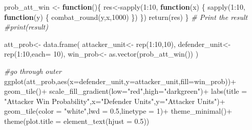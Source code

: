 \documentclass[
]{article}
\newenvironment{Shaded}{\begin{snugshade}}{\end{snugshade}}
\newcommand{\AttributeTok}[1]{\textcolor[rgb]{0.77,0.63,0.00}{#1}}
\newcommand{\CommentTok}[1]{\textcolor[rgb]{0.56,0.35,0.01}{\textit{#1}}}
\newcommand{\ControlFlowTok}[1]{\textcolor[rgb]{0.13,0.29,0.53}{\textbf{#1}}}
\newcommand{\DecValTok}[1]{\textcolor[rgb]{0.00,0.00,0.81}{#1}}
\newcommand{\FloatTok}[1]{\textcolor[rgb]{0.00,0.00,0.81}{#1}}
\newcommand{\FunctionTok}[1]{\textcolor[rgb]{0.00,0.00,0.00}{#1}}
\newcommand{\NormalTok}[1]{#1}
\newcommand{\OtherTok}[1]{\textcolor[rgb]{0.56,0.35,0.01}{#1}}
\newcommand{\SpecialCharTok}[1]{\textcolor[rgb]{0.00,0.00,0.00}{#1}}
\newcommand{\StringTok}[1]{\textcolor[rgb]{0.31,0.60,0.02}{#1}}
\begin{document}
\begin{Shaded}
\begin{Highlighting}[]
\NormalTok{prob\_att\_win }\OtherTok{\textless{}{-}} \ControlFlowTok{function}\NormalTok{()\{}
\NormalTok{  res}\OtherTok{\textless{}{-}}\FunctionTok{sapply}\NormalTok{(}\DecValTok{1}\SpecialCharTok{:}\DecValTok{10}\NormalTok{, }\ControlFlowTok{function}\NormalTok{(x) \{}
  \FunctionTok{sapply}\NormalTok{(}\DecValTok{1}\SpecialCharTok{:}\DecValTok{10}\NormalTok{, }\ControlFlowTok{function}\NormalTok{(y) \{}
    \FunctionTok{combat\_round}\NormalTok{(y,x,}\DecValTok{1000}\NormalTok{)}
\NormalTok{    \})}
\NormalTok{  \})}
  \FunctionTok{return}\NormalTok{(res)}
\NormalTok{\}}
\CommentTok{\# Print the result}
\CommentTok{\#print(result)}


\NormalTok{att\_prob}\OtherTok{\textless{}{-}} \FunctionTok{data.frame}\NormalTok{(}
\NormalTok{  attacker\_unit}\OtherTok{\textless{}{-}} \FunctionTok{rep}\NormalTok{(}\DecValTok{1}\SpecialCharTok{:}\DecValTok{10}\NormalTok{,}\DecValTok{10}\NormalTok{),}
\NormalTok{  defender\_unit}\OtherTok{\textless{}{-}} \FunctionTok{rep}\NormalTok{(}\DecValTok{1}\SpecialCharTok{:}\DecValTok{10}\NormalTok{,}\AttributeTok{each=} \DecValTok{10}\NormalTok{),}
\NormalTok{  win\_prob}\OtherTok{\textless{}{-}} \FunctionTok{as.vector}\NormalTok{(}\FunctionTok{prob\_att\_win}\NormalTok{())}
\NormalTok{)}


\CommentTok{\#go through outer }
\FunctionTok{ggplot}\NormalTok{(att\_prob,}\FunctionTok{aes}\NormalTok{(}\AttributeTok{x=}\NormalTok{defender\_unit,}\AttributeTok{y=}\NormalTok{attacker\_unit,}\AttributeTok{fill=}\NormalTok{win\_prob))}\SpecialCharTok{+}
  \FunctionTok{geom\_tile}\NormalTok{()}\SpecialCharTok{+}
  \FunctionTok{scale\_fill\_gradient}\NormalTok{(}\AttributeTok{low=}\StringTok{"red"}\NormalTok{,}\AttributeTok{high=}\StringTok{"darkgreen"}\NormalTok{)}\SpecialCharTok{+}
  \FunctionTok{labs}\NormalTok{(}\AttributeTok{title =} \StringTok{"Attacker Win Probability"}\NormalTok{,}\AttributeTok{x=}\StringTok{"Defender Units"}\NormalTok{,}\AttributeTok{y=}\StringTok{"Attacker Units"}\NormalTok{)}\SpecialCharTok{+}
  \FunctionTok{geom\_tile}\NormalTok{(}\AttributeTok{color =} \StringTok{"white"}\NormalTok{,}\AttributeTok{lwd =} \FloatTok{0.5}\NormalTok{,}\AttributeTok{linetype =} \DecValTok{1}\NormalTok{)}\SpecialCharTok{+}
  \FunctionTok{theme\_minimal}\NormalTok{()}\SpecialCharTok{+}
  \FunctionTok{theme}\NormalTok{(}\AttributeTok{plot.title =} \FunctionTok{element\_text}\NormalTok{(}\AttributeTok{hjust =} \FloatTok{0.5}\NormalTok{))}
\end{Highlighting}
\end{Shaded}
\end{document}
